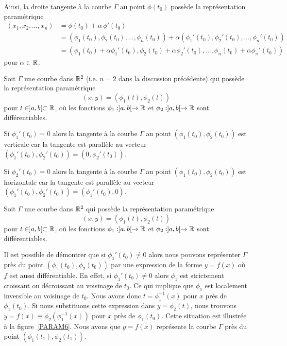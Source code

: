 {

Ainsi, la droite tangente à la courbe $\Gamma$ au point $\phi(t_0)$
possède la représentation paramétrique
\begin{align*}
(x_1,x_2, \ldots, x_n) &= \phi(t_0) + \alpha\, \phi'(t_0) \\
&= (\phi_1(t_0), \phi_2(t_0), \ldots, \phi_n(t_0))
+ \alpha (\phi_1'(t_0), \phi_2'(t_0), \ldots, \phi_n'(t_0)) \\
&= (\phi_1(t_0) + \alpha \phi_1'(t_0), \phi_2(t_0)+ \alpha
\phi_2'(t_0),  \ldots, \phi_n(t_0) + \alpha \phi_n'(t_0))
\end{align*}
pour $\alpha \in \mathbb{R}$.

\begin{rmk}
Soit $\Gamma$ une courbe dans $\mathbb{R}^2$ (i.e. $n=2$ dans la discussion
précédente) qui possède la représentation paramétrique
\[
(x,y) = (\phi_1(t), \phi_2(t))
\]
pour $t \in ]a,b[ \subset \mathbb{R}$, où les fonctions
$\phi_1:]a,b[ \rightarrow \mathbb{R}$ et $\phi_2:]a,b[ \rightarrow \mathbb{R}$
sont différentiables.

Si $\phi_1'(t_0) = 0$ alors la tangente à la courbe $\Gamma$ au point
$(\phi_1(t_0), \phi_2(t_0))$ est verticale car la tangente est
parallèle au vecteur
$(\phi_1'(t_0), \phi_2'(t_0)) = (0,\phi_2'(t_0))$.

Si $\phi_2'(t_0) = 0$ alors la tangente à la courbe $\Gamma$ au point
$(\phi_1(t_0), \phi_2(t_0))$ est horizontale car la tangente est
parallèle au vecteur $(\phi_1'(t_0), \phi_2'(t_0)) = (\phi_1'(t_0),0)$.
\end{rmk}

\begin{rmk}
Soit $\Gamma$ une courbe dans $\mathbb{R}^2$ qui possède la représentation
paramétrique
\[
(x,y) = (\phi_1(t), \phi_2(t))
\]
pour $t \in ]a,b[ \subset \mathbb{R}$, où les fonctions
$\phi_1:]a,b[ \rightarrow \mathbb{R}$ et $\phi_2:]a,b[ \rightarrow \mathbb{R}$
sont différentiables.

Il est possible de démontrer que si $\phi_1'(t_0)\neq 0$ alors nous pouvons
représenter $\Gamma$ près du point $(\phi_1(t_0),\phi_2(t_0))$ par une
expression de la forme $y=f(x)$ où $f$ est aussi différentiable.  En
effet, si $\phi_1'(t_0) \neq 0$ alors $\phi_1$ est strictement
croissant ou décroissant au voisinage de $t_0$.  Ce qui implique que
$\phi_1$ est localement inversible au voisinage de $t_0$.  Nous avons
donc $t=\phi_1^{-1}(x)$ pour $x$ près de $\phi_1(t_0)$.  Si nous
substituons cette expression dans
$y=\phi_2(t)$, nous trouvons $y=f(x) \equiv \phi_2(\phi_1^{-1}(x))$ pour
$x$ près de $\phi_1(t_0)$.  Cette situation est illustrée à la
figure~\ref{PARAM6}.  Nous avons que $y=f(x)$ représente la courbe $\Gamma$
près du point $(\phi_1(t_1),\phi_2(t_1))$.
\end{rmk}

}
